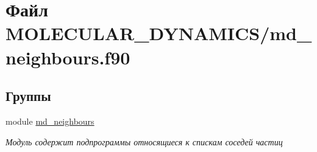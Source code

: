 \hypertarget{md__neighbours_8f90}{}\section{Файл M\+O\+L\+E\+C\+U\+L\+A\+R\+\_\+\+D\+Y\+N\+A\+M\+I\+C\+S/md\+\_\+neighbours.f90}
\label{md__neighbours_8f90}
\subsection*{Группы}
\begin{DoxyCompactItemize}
\item 
module \mbox{\hyperlink{namespacemd__neighbours}{md\+\_\+neighbours}}
\begin{DoxyCompactList}\small\item\em Модуль содержит подпрограммы относящиеся к спискам соседей частиц \end{DoxyCompactList}\end{DoxyCompactItemize}
